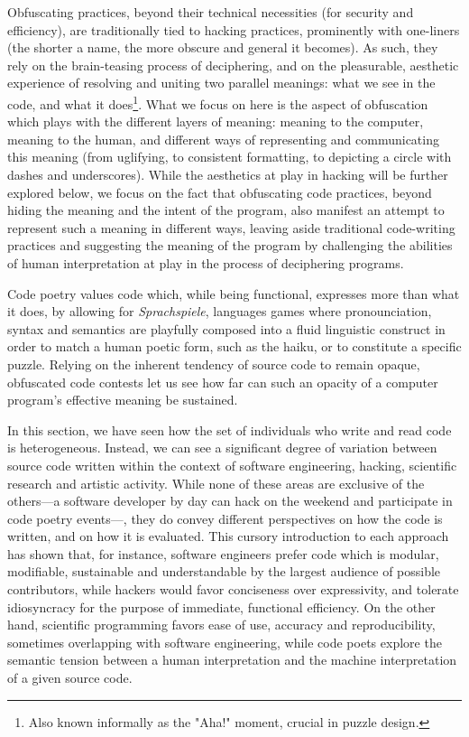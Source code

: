Obfuscating practices, beyond their technical necessities (for security and efficiency), are traditionally tied to hacking practices, prominently with one-liners (the shorter a name, the more obscure and general it becomes). As such, they rely on the brain-teasing process of deciphering, and on the pleasurable, aesthetic experience of resolving and uniting two parallel meanings: what we see in the code, and what it does\footnote{Also known informally as the "Aha!" moment, crucial in puzzle design.}. What we focus on here is the aspect of obfuscation which plays with the different layers of meaning: meaning to the computer, meaning to the human, and different ways of representing and communicating this meaning (from uglifying, to consistent formatting, to depicting a circle with dashes and underscores). While the aesthetics at play in hacking will be further explored below, we focus on the fact that obfuscating code practices, beyond hiding the meaning and the intent of the program, also manifest an attempt to represent such a meaning in different ways, leaving aside traditional code-writing practices and suggesting the meaning of the program by challenging the abilities of human interpretation at play in the process of deciphering programs.

Code poetry values code which, while being functional, expresses more than what it does, by allowing for \emph{Sprachspiele}, languages games where pronounciation, syntax and semantics are playfully composed into a fluid linguistic construct in order to match a human poetic form, such as the haiku, or to constitute a specific puzzle. Relying on the inherent tendency of source code to remain opaque, obfuscated code contests let us see how far can such an opacity of a computer program's effective meaning be sustained.

\vspace{1\baselineskip}

In this section, we have seen how the set of individuals who write and read code is heterogeneous. Instead, we can see a significant degree of variation between source code written within the context of software engineering, hacking, scientific research and artistic activity. While none of these areas are exclusive of the others—a software developer by day can hack on the weekend and participate in code poetry events—, they do convey different perspectives on how the code is written, and on how it is evaluated. This cursory introduction to each approach has shown that, for instance, software engineers prefer code which is modular, modifiable, sustainable and understandable by the largest audience of possible contributors, while hackers would favor conciseness over expressivity, and tolerate idiosyncracy for the purpose of immediate, functional efficiency. On the other hand, scientific programming favors ease of use, accuracy and reproducibility, sometimes overlapping with software engineering, while code poets explore the semantic tension between a human interpretation and the machine interpretation of a given source code.

